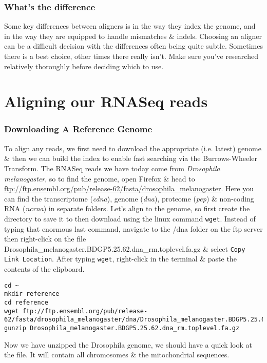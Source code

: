 \subsubsection{What's the difference}
Some key differences between aligners is in the way they index the genome, and in the way they are equipped to handle mismatches \& indels.
Choosing an aligner can be a difficult decision with the differences often being quite subtle.
Sometimes there is a best choice, other times there really isn't.
Make sure you've researched relatively thoroughly before deciding which to use.

\section{Aligning our RNASeq reads}
\subsubsection{Downloading A Reference Genome}
\begin{steps}
To align any reads, we first need to download the appropriate (i.e. latest) genome \& then we can build the index to enable fast searching via the Burrows-Wheeler Transform.
The RNASeq reads we have today come from \textit{Drosophila melanogaster}, so to find the genome, open Firefox \& head to \url{ftp://ftp.ensembl.org/pub/release-62/fasta/drosophila_melanogaster}.
Here you can find the transcriptome (\textit{cdna}), genome (\textit{dna}), proteome (\textit{pep}) \& non-coding RNA (\textit{ncrna}) in separate folders.
Let's align to the genome, so first create the directory to save it to then download using the linux command \texttt{wget}.
Instead of typing that enormous last command, navigate to the /dna folder on the ftp server then right-click on the file Drosophila_melanogaster.BDGP5.25.62.dna_rm.toplevel.fa.gz \& select \texttt{Copy Link Location}.
After typing \texttt{wget}, right-click in the terminal \& paste the contents of the clipboard.
\begin{lstlisting}
cd ~
mkdir reference
cd reference
wget ftp://ftp.ensembl.org/pub/release-62/fasta/drosophila_melanogaster/dna/Drosophila_melanogaster.BDGP5.25.62.dna_rm.toplevel.fa.gz
gunzip Drosophila_melanogaster.BDGP5.25.62.dna_rm.toplevel.fa.gz
\end{lstlisting}
\end{steps}

\begin{information}
Now we have unzipped the Drosophila genome, we should have a quick look at the file.
It will contain all chromosomes \& the mitochondrial sequences.
\end{information}


